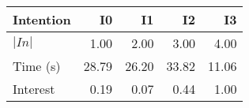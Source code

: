 \begin{tabular}{lrrrr}
\toprule
Intention & I0 & I1 & I2 & I3 \\
\midrule
$|In|$ & 1.00 & 2.00 & 3.00 & 4.00 \\
Time (s) & 28.79 & 26.20 & 33.82 & 11.06 \\
Interest & 0.19 & 0.07 & 0.44 & 1.00 \\
\bottomrule
\end{tabular}
